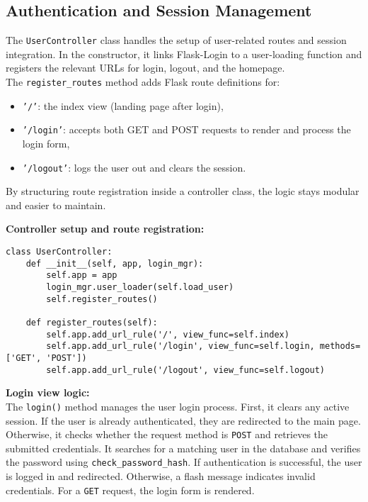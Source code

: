 \documentclass[12pt]{article}
\begin{document}
\subsection{Authentication and Session Management}

The \texttt{UserController} class handles the setup of user-related routes and session integration. In the constructor, it links Flask-Login to a user-loading function and registers the relevant URLs for login, logout, and the homepage.\\

The \texttt{register\_routes} method adds Flask route definitions for:
\begin{itemize}
  \item \texttt{'/'}: the index view (landing page after login),
  \item \texttt{'/login'}: accepts both GET and POST requests to render and process the login form,
  \item \texttt{'/logout'}: logs the user out and clears the session.
\end{itemize}

\noindent By structuring route registration inside a controller class, the logic stays modular and easier to maintain.
\newpage

\noindent \textbf{Controller setup and route registration:} \\
\begin{verbatim}
class UserController:
    def __init__(self, app, login_mgr):
        self.app = app
        login_mgr.user_loader(self.load_user)
        self.register_routes()

    def register_routes(self):
        self.app.add_url_rule('/', view_func=self.index)
        self.app.add_url_rule('/login', view_func=self.login, methods=['GET', 'POST'])
        self.app.add_url_rule('/logout', view_func=self.logout)
\end{verbatim} 
\vspace{1em}
\noindent \textbf{Login view logic:} \\

\noindent The \texttt{login()} method manages the user login process. First, it clears any active session. If the user is already authenticated, they are redirected to the main page. Otherwise, it checks whether the request method is \texttt{POST} and retrieves the submitted credentials. It searches for a matching user in the database and verifies the password using \texttt{check\_password\_hash}. If authentication is successful, the user is logged in and redirected. Otherwise, a flash message indicates invalid credentials. For a \texttt{GET} request, the login form is rendered. 
\end{document}
